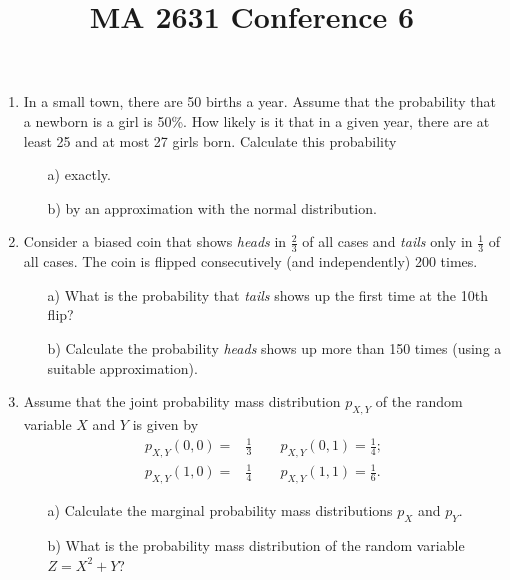 \documentclass{article}
\title{MA 2631 Conference 6}
\begin{document}
\maketitle



\begin{enumerate}

\item

In a small town, there are 50 births a year. Assume that the probability that a newborn is a girl is 50\%. How likely is it that in a given year, there are at least 25 and at most 27 girls born. Calculate this probability
\begin{itemize}
	\item[a)] exactly.
	\item[b)] by an approximation with the normal distribution.
\end{itemize}


\item
Consider a biased coin that shows {\em heads} in $\frac{2}{3}$ of all cases and {\em tails} only in $\frac{1}{3}$ of all cases. The coin is flipped consecutively (and independently) 200 times. 
\begin{itemize}
	\item[a)] What is the probability that {\em tails} shows up the first time at the 10th flip?
	\item[b)] Calculate the probability  {\em heads}  shows up more than 150 times (using a suitable approximation). 

\end{itemize}

\item 

Assume that the joint probability mass distribution $p_{X,Y}$ of the random variable $X$ and $Y$ is given by
\begin{align*}
p_{X,Y}(0,0) =& \frac{1}{3} \qquad p_{X,Y}(0,1)= \frac{1}{4};\\
p_{X,Y}(1,0) =& \frac{1}{4} \qquad  p_{X,Y}(1,1) = \frac{1}{6}.
\end{align*}

\begin{itemize}
	\item[a)] Calculate the marginal probability mass distributions $p_X$ and $p_Y$.
	\item[b)] What is the probability mass distribution of the random variable $Z = X^2 + Y$?
\end{itemize}


\end{enumerate}
\end{document}
